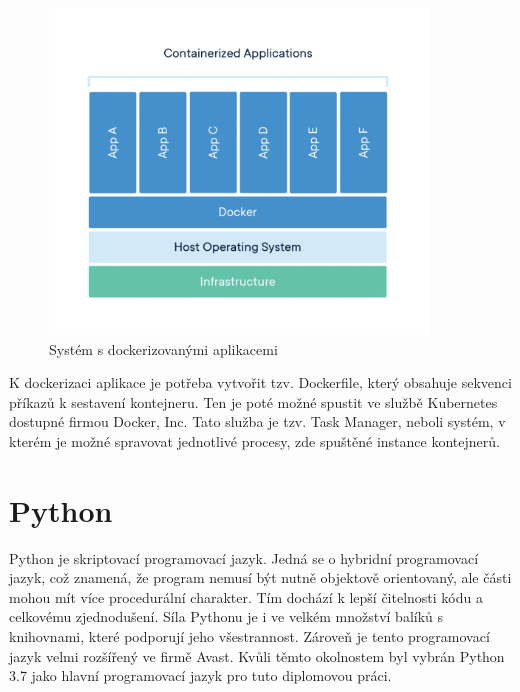 \documentclass[thesis=M,czech,hidelinks]{FITthesis}[2013/05/06]
\begin{document}
\begin{figure}[H]
	\centering
	\includegraphics[width=10cm]{pictures/docker.png}
	\caption{Systém s dockerizovanými aplikacemi \cite{docker}}
	\label{fig:docker}
\end{figure}



K dockerizaci aplikace je potřeba vytvořit tzv. Dockerfile, který obsahuje sekvenci příkazů k sestavení kontejneru. Ten je poté možné spustit ve službě Kubernetes dostupné firmou Docker, Inc. Tato služba je tzv. Task Manager, neboli systém, v kterém je možné spravovat jednotlivé procesy, zde spuštěné instance kontejnerů.


\section{Python}\label{sec:python}
Python je skriptovací programovací jazyk. Jedná se o hybridní programovací jazyk, což znamená, že program nemusí být nutně objektově orientovaný, ale části mohou mít více procedurální charakter. Tím dochází k lepší čitelnosti kódu a celkovému zjednodušení. Síla Pythonu je i ve velkém množství balíků s knihovnami, které podporují jeho všestrannost. Zároveň je tento programovací jazyk velmi rozšířený ve firmě Avast. Kvůli těmto okolnostem byl vybrán Python 3.7 jako hlavní programovací jazyk pro tuto diplomovou práci.
\end{document}
